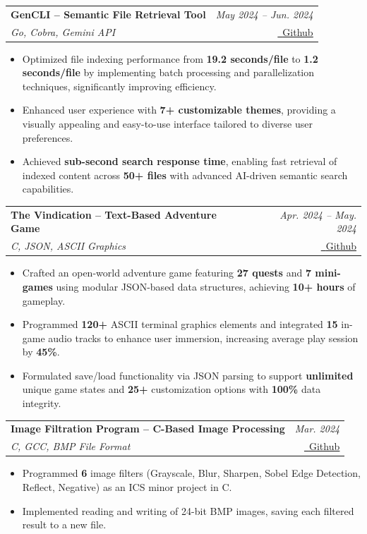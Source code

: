 \documentclass[letterpaper,10pt]{article}
\makeatletter
\newcommand{\resumeItem}[1]{
  \item\small{
    {#1 \vspace{-1mm}}
  }
}
\newcommand{\resumeProject}[4]{
  \item
    \begin{tabular*}{0.97\textwidth}[t]{l@{\extracolsep{\fill}}r}
      \textbf{\small #1} & \textit{\small #3} \\
      \textit{\small #2} & \small #4 \\
    \end{tabular*}\vspace{-7pt}
}
\newcommand{\resumeItemListStart}{\begin{itemize}}
\newcommand{\resumeItemListEnd}{\end{itemize}\vspace{-5pt}}
\makeatother
\begin{document}
      \resumeProject
        {GenCLI -- Semantic File Retrieval Tool}
        {Go, Cobra, Gemini API}
        {May 2024 -- Jun. 2024}
        {\href{https://github.com/lakshyajain-0291/gencli}{\faGithub \ \underline{Github}}}
        \resumeItemListStart
          \resumeItem{Optimized file indexing performance from \textbf{19.2 seconds/file} to \textbf{1.2 seconds/file} by implementing batch processing and parallelization techniques, significantly improving efficiency.}
          \resumeItem{Enhanced user experience with \textbf{7+ customizable themes}, providing a visually appealing and easy-to-use interface tailored to diverse user preferences.}
          \resumeItem{Achieved \textbf{sub-second search response time}, enabling fast retrieval of indexed content across \textbf{50+ files} with advanced AI-driven semantic search capabilities.}
        \resumeItemListEnd

      \resumeProject
        {The Vindication -- Text-Based Adventure Game}
        {C, JSON, ASCII Graphics}
        {Apr. 2024 -- May. 2024}
        {\href{https://github.com/lakshyajain-0291/Text-based-Adventure-Game-in-C}{\faGithub \ \underline{Github}}}
        \resumeItemListStart
          \resumeItem{Crafted an open-world adventure game featuring \textbf{27 quests} and \textbf{7 mini-games} using modular JSON-based data structures, achieving \textbf{10+ hours} of gameplay.}
          \resumeItem{Programmed \textbf{120+} ASCII terminal graphics elements and integrated \textbf{15} in-game audio tracks to enhance user immersion, increasing average play session by \textbf{45\%}.}
          \resumeItem{Formulated save/load functionality via JSON parsing to support \textbf{unlimited} unique game states and \textbf{25+} customization options with \textbf{100\%} data integrity.}
        \resumeItemListEnd

      \resumeProject
        {Image Filtration Program -- C-Based Image Processing}
        {C, GCC, BMP File Format}
        {Mar. 2024}
        {\href{https://github.com/lakshyajain-0291/Image-filtration-in-C}{\faGithub \ \underline{Github}}}
        \resumeItemListStart
          \resumeItem{Programmed \textbf{6} image filters (Grayscale, Blur, Sharpen, Sobel Edge Detection, Reflect, Negative) as an ICS minor project in C.}
          \resumeItem{Implemented reading and writing of 24-bit BMP images, saving each filtered result to a new file.}
        \resumeItemListEnd
\end{document}
